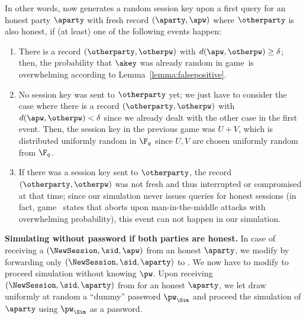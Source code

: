 \begin{games}
In other words, \Func now generates a random session key upon a first \NewKey query for an honest party $\aparty$ with fresh record $(\aparty,\apw)$ where $\otherparty$ is also honest, if (at least) one of the following events happen:
\begin{enumerate}
 \item There is a record $(\otherparty,\otherpw)$ with $d(\apw,\otherpw)\geq\delta$; then, the probability that $\akey$ was already random in game~\previousgame is overwhelming according to Lemma~\ref{lemma:falsepositive}.
 \item No session key was sent to $\otherparty$ yet; we just have to consider the case where there is a record $(\otherparty,\otherpw)$ with $d(\apw,\otherpw)<\delta$ since we already dealt with the other case in the first event. Then, the session key in the previous game was $U+V$, which is distributed uniformly random in $\F_q$ since $U,V$ are chosen uniformly random from $\F_q$.
 \item If there was a session key sent to $\otherparty$, the record $(\otherparty,\otherpw)$ was not fresh and thus interrupted or compromised at that time; since our simulation never issues \TestPwd queries for honest sessions (in fact, game~ states that \Sim aborts upon man-in-the-middle attacks with overwhelming probability), this event can not happen in our simulation. %
\end{enumerate} 

\textbf{Simulating without password if both parties are honest.}
In case of receiving a $(\NewSession,\sid,\apw)$ from an honest $\aparty$, we modify \Func by forwarding only $(\NewSession,\sid,\aparty)$ to \Sim. We now have to modify \Sim to proceed simulation without knowing $\pw$. Upon receiving $(\NewSession,\sid,\aparty)$ from \Func for an honest $\aparty$, we let \Sim draw uniformly at random a ``dummy'' password $\pw_\Sim$ and proceed the simulation of $\aparty$ using $\pw_\Sim$ as a password.


\end{games}
